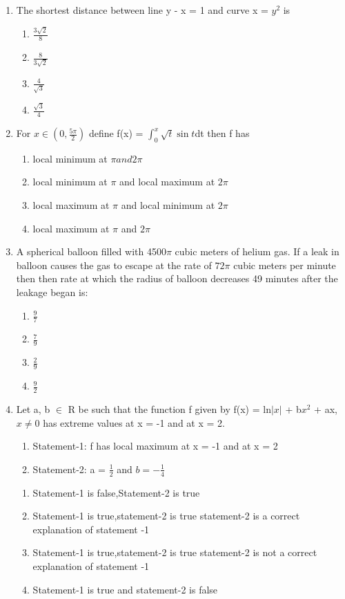 \begin{enumerate}[label=\arabic*.,ref=\thesubsection.\theenumi]
\item The shortest distance between line y - x = 1 and curve x = $y^2$ is 
\begin{enumerate}
\item $\frac{3\sqrt{2}}{8}$
\item $\frac{8}{3\sqrt{2}}$
\item $\frac{4}{\sqrt{3}}$
\item $\frac{\sqrt{3}}{4}$
\end{enumerate}

\item For $x \in (0, \frac{5\pi}{2})$ define f(x) = $\int_{0}^{x}\sqrt{t} \sin t$dt then f has 
\begin{enumerate}
\item local minimum at $\pi and 2\pi$
\item local minimum at $\pi$ and local maximum at $2\pi$
\item local maximum at $\pi$ and local minimum at $2\pi$
\item local maximum at $\pi$ and $2\pi$
\end{enumerate}

\item A spherical balloon filled with 4500$\pi$ cubic meters of helium gas. If a leak in balloon causes the gas to escape at the rate of $72\pi$ cubic meters per minute then then rate at which the radius of balloon  decreases 49 minutes after the leakage began is:
\begin{enumerate}
\item $\frac{9}{7}$
\item $\frac{7}{9}$
\item $\frac{2}{9}$
\item $\frac{9}{2}$
\end{enumerate}

\item Let a, b $\in$ R be such that the function f given by f(x) = ln$|x|$ + b$x^2$ + ax, $x \neq 0$ has extreme values at x = -1 and at x = 2.
\begin{enumerate}
\item Statement-1: f has local maximum at x = -1 and at x = 2
\item Statement-2: a = $\frac{1}{2}$ and $b = -\frac{1}{4}$
\end{enumerate}
\begin{enumerate}
\item Statement-1 is false,Statement-2 is true
\item Statement-1 is true,statement-2 is true statement-2 is a correct explanation of statement -1
\item Statement-1 is true,statement-2 is true statement-2 is not a correct explanation of statement -1
\item Statement-1 is true and statement-2 is false
\end{enumerate}


\end{enumerate}
